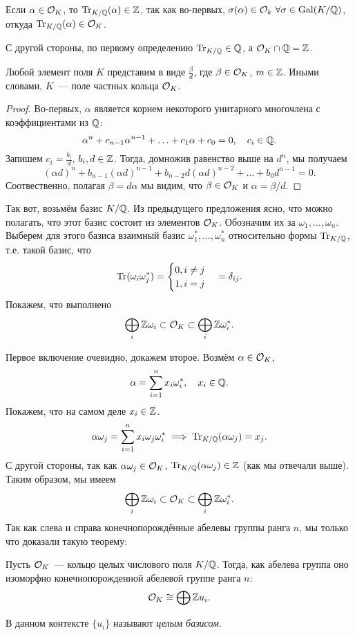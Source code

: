 	\begin{remark}
		Если $\alpha \in \mathcal{O}_{K}$, то $\operatorname{Tr}_{K/\mathbb{Q}}(\alpha) \in \mathbb{Z}$, так как во-первых, $\sigma(\alpha) \in \mathcal{O}_k \ \forall \sigma \in \operatorname{Gal}(K/\mathbb{Q})$, откуда $\operatorname{Tr}_{K/\mathbb{Q}}(\alpha) \in \mathcal{O}_{K}$.

		С другой стороны, по первому определению $\operatorname{Tr}_{K/\mathbb{Q}} \in \mathbb{Q}$, а $\mathcal{O}_{K} \cap \mathbb{Q} = \mathbb{Z}$. 
	\end{remark}

	\begin{statement}
		Любой элемент поля $K$ представим в виде $\frac{\beta}{d}$, где $\beta \in \mathcal{O}_{K}$, $m \in \mathbb{Z}$. Иными словами, $K$~--- поле частных кольца $\mathcal{O}_{K}$. 
	\end{statement}
	\begin{proof}
		Во-первых, $\alpha$ является корнем некоторого унитарного многочлена с коэффициентами из $\mathbb{Q}$:
		\[
			\alpha^n + c_{n - 1}\alpha^{n - 1} + \ldots + c_{1}\alpha + c_0 = 0, \quad c_i \in \mathbb{Q}.
		\]
		Запишем $c_i = \frac{b_i}{d}$, $b_i, d \in \mathbb{Z}$. Тогда, домножив равенство выше на $d^n$, мы получаем  
		\[
			(\alpha d)^n + b_{n - 1}(\alpha d)^{n - 1} + b_{n - 2} d (\alpha d)^{n - 2} + \ldots + b_0 d^{n - 1} = 0.
		\]
		Соотвественно, полагая $\beta = d\alpha$ мы видим, что $\beta \in \mathcal{O}_{K}$ и $\alpha = \beta / d$. 
	\end{proof}

	Так вот, возьмём базис $K/\mathbb{Q}$. Из предыдущего предложения ясно, что можно полагать, что этот базис состоит из элементов $\mathcal{O}_{K}$. Обозначим их за $\omega_1, \ldots, \omega_n$. Выберем для этого базиса взаимный базис $\omega_1^*, \ldots, \omega_n^*$ относительно формы $\operatorname{Tr}_{K/\mathbb{Q}}$, т.е. такой базис, что 
	\[
		\operatorname{Tr}(\omega_i \omega_j^*) = \begin{cases} 0, i \neq j \\ 1, i = j \end{cases} = \delta_{i j}.
	\]
	Покажем, что выполнено 
	\[
		\bigoplus_{i} \mathbb{Z} \omega_i \subset \mathcal{O}_{K} \subset \bigoplus_{i} \mathbb{Z} \omega_i^{*}.
	\]

	Первое включение очевидно, докажем второе. Возмём $\alpha \in \mathcal{O}_{K}$,
	\[
	 	\alpha = \sum_{i = 1}^{n} x_i \omega_i^{*}, \quad x_i \in \mathbb{Q}.
	 \] 
	 Покажем, что на самом деле $x_i \in \mathbb{Z}$. 
	 \[
	 	\alpha \omega_j = \sum_{i = 1}^{n} x_i \omega_j \omega_i^{*} \implies \operatorname{Tr}_{K/\mathbb{Q}}(\alpha \omega_j) = x_j. 
	 \]
	 С другой стороны, так как $\alpha \omega_j \in \mathcal{O}_{K}$, $\operatorname{Tr}_{K/\mathbb{Q}}(\alpha \omega_j) \in \mathbb{Z}$ (как мы отвечали выше). Таким образом, мы имеем  
	 \[
		\bigoplus_{i} \mathbb{Z} \omega_i \subset \mathcal{O}_{K} \subset \bigoplus_{i} \mathbb{Z} \omega_i^{*}.
	\]
	Так как слева и справа конечнопорождённые абелевы группы ранга $n$, мы только что доказали такую теорему: 

	\begin{theorem} 
		Пусть $\mathcal{O}_{K}$~--- кольцо целых числового поля $K/\mathbb{Q}$. Тогда, как абелева группа оно изоморфно конечнопорожденной абелевой группе ранга $n$:
		\[
			\mathcal{O}_{K} \cong \bigoplus \mathbb{Z} u_i.
		\]

		В данном контексте $\{ u_i \}$ называют \emph{целым базисом}. 
	\end{theorem}




